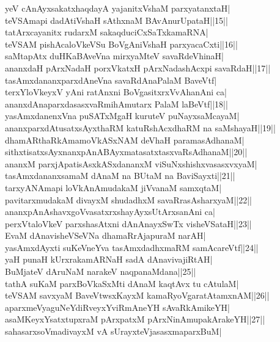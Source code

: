 \documentclass{article}
\begin{document}
yeV cAnAyxsakatxhaqdayA yajanitxVshaM parxyatanxtaH|\\
teVSAmapi dadAtiVshaH sAthxnaM BAvAnurUpataH||15||\\
tatArxcayanitx rudarxM sakaqduciCxSaTxkamaRNA|\\
teVSAM pishAcaloVkeVSu BoVgAniVshaH parxyacaCxti||16||\\
saMtapAtx duHKaBAveVna mirxyaMteV savaRdeVhinaH|\\
ananxdaH pArxNadaH porxVkatxH pArxNadashAcxpi savaRdaH||17||\\
tasAmxdananxparxdAneVna savaRdAnaPalaM BaveVtf|\\
terxYloVkeyxV yAni ratAnxni BoVgasitxrxVvAhanAni ca|\\
ananxdAnaparxdasasxvaRmihAmutarx PalaM laBeVtf||18||\\
yasAmxdanenxVna puSATxMgaH kuruteV puNayxsaMcayaM|\\
ananxparxdAtusatxsAyxthaRM katuRshAcxdhaRM na saMshayaH||19||\\
dhamARthaRkAmamoVkASxNAM deVhaH paramasAdhanaM|\\
sithxtisatxsAyxnanxpAnABAyxmatasatxtasxvaRsAdhanaM||20||\\
ananxM parxjApatisAsxkASxdananxM viSuNxshishxvasasxvxyaM|\\
tasAmxdananxsamaM dAnaM na BUtaM na BaviSayxti||21||\\
tarxyANAmapi loVkAnAmudakaM jiVvanaM samxqtaM|\\
pavitarxmudakaM divayxM shudadhxM savaRrasAsharxyaM||22||\\
ananxpAnAshavxgoVvasatxrxshayAyxsUtArxsanAni ca|\\
perxVtaloVkeV parxshasAtxni dAnAnayxSwTx visheVSataH||23||\\
EvaM dAnavisheVSeVNa dhamaRrAjapuraM narAH|\\
yasAmxdAyxti suKeVneYva tasAmxdadhxmaRM samAcareVtf||24||\\
yaH punaH kUrxrakamARNaH sadA dAnavivajiRtAH|\\
BuMjateV dAruNaM narakeV naqpanaMdana||25||\\
tathA suKaM parxBoVkaSxMti dAnaM kaqtAvx tu cAtulaM|\\
teVSAM savxyaM BaveVtwsxKayxM kamaRyoVgaratAtamxnAM||26||\\
aparxmeVyaguNeYdiRveyxYviRmAneYH sAvaRkAmikeYH|\\
asaMKeyxYsatxtupxraM pArxpatxM pArxNinAmupakArakeYH||27||\\
sahasarxsoVmadivayxM vA sUrayxteVjasasxmaparxBuM|\\
\end{document}
